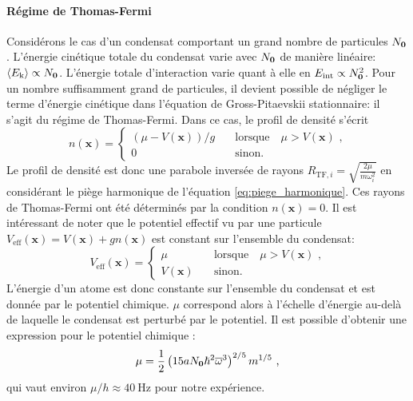 \paragraph*{Régime de Thomas-Fermi}
Considérons le cas d'un condensat comportant un grand nombre de particules $N_{\mathbf{0}}$. L'énergie cinétique totale du condensat varie avec $N_{\mathbf{0}}$ de manière linéaire: $\left\langle E_{\mathrm{k}}\right\rangle\propto N_{\mathbf{0}}$. L'énergie totale d'interaction varie quant à elle en $E_{\mathrm{int}}\propto N_{\mathbf{0}}^2$. Pour un nombre suffisamment grand de particules, il devient possible de négliger le terme d'énergie cinétique dans l'équation de Gross-Pitaevskii stationnaire: il s'agit du régime de Thomas-Fermi.
Dans ce cas, le profil de densité s'écrit
\begin{equation}
n(\mathbf{x})=\left\{
					\begin{array}{ll}
						(\mu-V(\mathbf{x}))/g &\quad \text{lorsque} \quad \mu>V(\mathbf{x}) \text{ ,}\\
						0 &\quad \text{sinon.}
					\end{array} 
				\right.
\end{equation}
Le profil de densité est donc une parabole inversée de rayons $R_{\mathrm{TF},i}=\sqrt{\frac{2\mu}{m\omega_i^2}}$ en considérant le piège harmonique de l'équation \ref{eq:piege_harmonique}.
Ces rayons de Thomas-Fermi ont été déterminés par la condition $n(\mathbf{x})=0$. Il est intéressant de noter que le potentiel effectif vu par une particule $V_{\mathrm{eff}}(\mathbf{x})=V(\mathbf{x})+gn(\mathbf{x})$ est constant sur l'ensemble du condensat:
\begin{equation}
V_{\mathrm{eff}}(\mathbf{x})= \left\{
									\begin{array}{ll}
										\mu &\quad \text{lorsque} \quad \mu>V(\mathbf{x}) \text{ ,}\\
										V(\mathbf{x}) &\quad \text{sinon.}
									\end{array}
							\right.
\end{equation}
L'énergie d'un atome est donc constante sur l'ensemble du condensat et est donnée par le potentiel chimique. $\mu$ correspond alors à l'échelle d'énergie au-delà de laquelle le condensat est perturbé par le potentiel. Il est possible d'obtenir une expression pour le potentiel chimique \citep{pethick2008bose}: 
\begin{equation}
\mu=\frac{1}{2} \left( 15a N_{\mathbf{0}} \hslash^2 \overline{\omega}^3 \right) ^{2/5} m^{1/5} \text{ ,}
\end{equation}
qui vaut environ $\mu/h\approx\SI{40}{\hertz}$ pour notre expérience.

